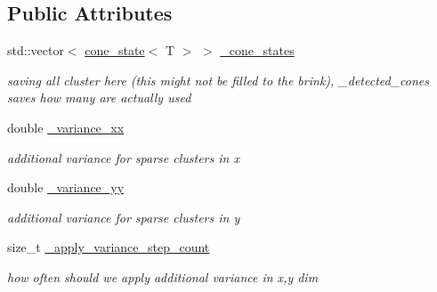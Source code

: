 \subsection*{Public Attributes}
\begin{DoxyCompactItemize}
\item 
\mbox{\label{classclara_1_1data__association_a943d1f6bda23692fa925652286328a75}} 
std\+::vector$<$ \hyperlink{classclara_1_1cone__state}{cone\+\_\+state}$<$ T $>$ $>$ \hyperlink{classclara_1_1data__association_a943d1f6bda23692fa925652286328a75}{\+\_\+cone\+\_\+states}
\begin{DoxyCompactList}\small\item\em saving all cluster here (this might not be filled to the brink), \+\_\+detected\+\_\+cones saves how many are actually used \end{DoxyCompactList}\item 
\mbox{\label{classclara_1_1data__association_a0107b53a2e35060afe9ad45b348e786a}} 
double \hyperlink{classclara_1_1data__association_a0107b53a2e35060afe9ad45b348e786a}{\+\_\+variance\+\_\+xx}
\begin{DoxyCompactList}\small\item\em additional variance for sparse clusters in x \end{DoxyCompactList}\item 
\mbox{\label{classclara_1_1data__association_a3ecfbabbc7c8e2297e908180108e3d8b}} 
double \hyperlink{classclara_1_1data__association_a3ecfbabbc7c8e2297e908180108e3d8b}{\+\_\+variance\+\_\+yy}
\begin{DoxyCompactList}\small\item\em additional variance for sparse clusters in y \end{DoxyCompactList}\item 
\mbox{\label{classclara_1_1data__association_a91ab865389d263f59c9fa916ab840555}} 
size\+\_\+t \hyperlink{classclara_1_1data__association_a91ab865389d263f59c9fa916ab840555}{\+\_\+apply\+\_\+variance\+\_\+step\+\_\+count}
\begin{DoxyCompactList}\small\item\em how often should we apply additional variance in x,y dim \end{DoxyCompactList}\item 

\end{DoxyCompactItemize}
